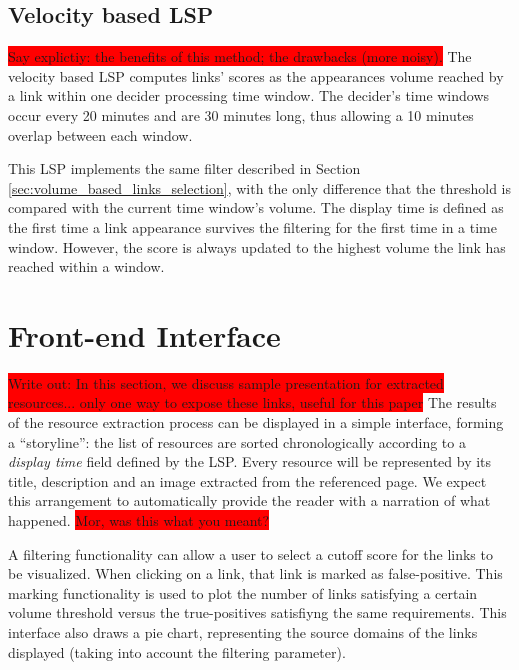 \documentclass{sig-alternate}
\newcommand{\todo}[1]{\colorbox{red}{#1}}
\begin{document}
\subsection{Velocity based LSP}
\label{sec:velocity_based_links_selection}
\todo{Say explictiy: the benefits of this method; the drawbacks (more noisy).}
The velocity based LSP computes links' scores as the appearances volume reached by a link within one decider processing time window. The decider's time windows occur every 20 minutes and are 30 minutes long, thus allowing a 10 minutes overlap between each window.

This LSP implements the same filter described in Section \ref{sec:volume_based_links_selection}, with the only difference that the threshold is compared with the current time window's volume. The display time is defined as the first time a link appearance survives the filtering for the first time in a time window. However, the score is always updated to the highest volume the link has reached within a window.

\section{Front-end Interface}
\todo{Write out: In this section, we discuss sample presentation for extracted resources... only one way to expose these links, useful for this paper}
The results of the resource extraction process can be displayed in a simple interface, forming a ``storyline'': the list of resources are sorted chronologically according to a \emph{display time} field defined by the LSP. Every resource will be represented by its title, description and an image extracted from the referenced page. We expect this arrangement to automatically provide the reader with a narration of what happened. \todo{Mor, was this what you meant?}

A filtering functionality can allow a user to select a cutoff score for the links to be visualized. When clicking on a link, that link is marked as false-positive. This marking functionality is used to plot the number of links satisfying a certain volume threshold versus the true-positives satisfiyng the same requirements. This interface also draws a pie chart, representing the source domains of the links displayed (taking into account the filtering parameter).
\end{document}
